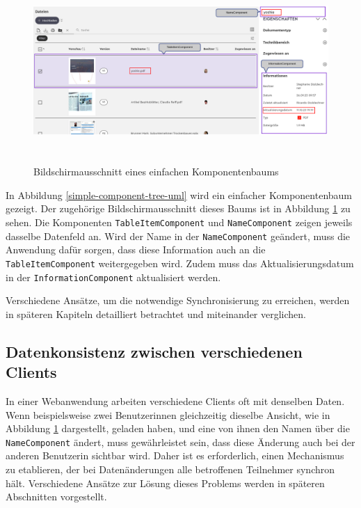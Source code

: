 \documentclass[12pt]{book}          %
\begin{document}
\begin{figure}[htbp]
\centering
\includegraphics[height=7cm]{abbildungen/simple-comp-tree-screenshot.png}
\caption{Bildschirmausschnitt eines einfachen Komponentenbaums}
\label{simple-component-tree-screenshot}
\end{figure}

In Abbildung \ref{simple-component-tree-uml} wird ein einfacher Komponentenbaum gezeigt. Der zugehörige Bildschirmausschnitt dieses Baums ist in Abbildung \ref{simple-component-tree-screenshot} zu sehen. Die Komponenten \texttt{TableItemComponent} und \texttt{NameComponent} zeigen jeweils dasselbe Datenfeld an. Wird der Name in der \texttt{NameComponent} geändert, muss die Anwendung dafür sorgen, dass diese Information auch an die \texttt{TableItemComponent} weitergegeben wird. Zudem muss das Aktualisierungsdatum in der \texttt{InformationComponent} aktualisiert werden.

Verschiedene Ansätze, um die notwendige Synchronisierung zu erreichen, werden in späteren Kapiteln detailliert betrachtet und miteinander verglichen.

\subsection{Datenkonsistenz zwischen verschiedenen Clients}
\label{subsec-datenkonsistenz-zwischen-zwei-verschiedenen-clients}

In einer Webanwendung arbeiten verschiedene Clients oft mit denselben Daten. Wenn beispielsweise zwei Benutzerinnen gleichzeitig dieselbe Ansicht, wie in Abbildung \ref{simple-component-tree-screenshot} dargestellt, geladen haben, und eine von ihnen den Namen über die \texttt{NameComponent} ändert, muss gewährleistet sein, dass diese Änderung auch bei der anderen Benutzerin sichtbar wird. Daher ist es erforderlich, einen Mechanismus zu etablieren, der bei Datenänderungen alle betroffenen Teilnehmer synchron hält. Verschiedene Ansätze zur Lösung dieses Problems werden in späteren Abschnitten vorgestellt.
\end{document}
